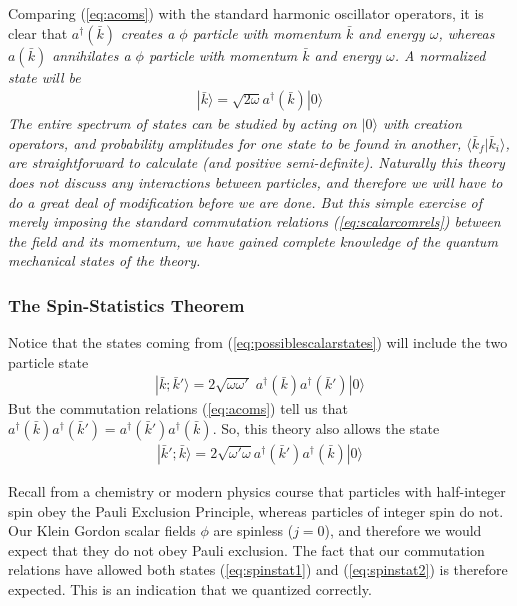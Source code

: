 \documentclass[12pt,epsf]{article}
\begin{document}
Comparing (\ref{eq:acoms}) with the standard harmonic oscillator
operators, it is clear that $a^{\dagger}(\bar k )$ \it creates \rm a
$\phi$ particle with momentum $\bar k$ and energy $\omega$, whereas
$a(\bar k )$ annihilates a $\phi$ particle with momentum $\bar k $ and
energy $\omega$.  A normalized state will be 
\begin{eqnarray}
|\bar k \rangle = \sqrt{2\omega} a^{\dagger} (\bar k ) |0\rangle
\label{eq:possiblescalarstates}
\end{eqnarray}
The entire spectrum of states can be studied by acting on $|0\rangle$
with creation operators, and probability amplitudes for one state to be
found in another, $\langle \bar k_f|\bar k_i\rangle$, are
straightforward to calculate (and positive semi-definite).  Naturally
this theory does not discuss any interactions between particles, and
therefore we will have to do a great deal of modification before we are
done.  But this simple exercise of merely imposing the standard
commutation relations (\ref{eq:scalarcomrels}) between the field and
its momentum, we have gained complete knowledge of the quantum
mechanical states of the theory.  

\subsubsection{The Spin-Statistics Theorem}
\label{sec:spinstat}

Notice that the states coming from (\ref{eq:possiblescalarstates}) will
include the two particle state 
\begin{eqnarray}
|\bar k ; \bar k '\rangle = 2\sqrt{\omega \omega '}\; a^{\dagger}(\bar
k ) a^{\dagger}(\bar k ')|0\rangle \label{eq:spinstat1}
\end{eqnarray}
But the commutation relations (\ref{eq:acoms}) tell us that
$a^{\dagger}(\bar k ) a^{\dagger}(\bar k') =a^{\dagger}(\bar k' )
a^{\dagger}(\bar k)$.  So, this theory also allows the state 
\begin{eqnarray}
|\bar k ' ; \bar k \rangle = 2\sqrt{\omega' \omega} a^{\dagger} (\bar
k') a^{\dagger}(\bar k)|0\rangle \label{eq:spinstat2}
\end{eqnarray}

Recall from a chemistry or modern physics course that particles with
half-integer spin obey the Pauli Exclusion Principle, whereas
particles of integer spin do not.  Our Klein Gordon scalar fields
$\phi$ are spinless ($j=0$), and therefore we would expect that they do
not obey Pauli exclusion.  The fact that our commutation relations have
allowed both states (\ref{eq:spinstat1}) and (\ref{eq:spinstat2}) is
therefore expected.  This is an indication that we quantized correctly. 
\end{document}
